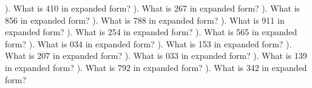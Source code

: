 \documentclass{article}%
\begin{document}
). What is 410 in expanded form?%
\newline%
\newline%
). What is 267 in expanded form?%
\newline%
\newline%
). What is 856 in expanded form?%
\newline%
\newline%
). What is 788 in expanded form?%
\newline%
\newline%
). What is 911 in expanded form?%
\newline%
\newline%
). What is 254 in expanded form?%
\newline%
\newline%
). What is 565 in expanded form?%
\newline%
\newline%
). What is 034 in expanded form?%
\newline%
\newline%
). What is 153 in expanded form?%
\newline%
\newline%
). What is 207 in expanded form?%
\newline%
\newline%
). What is 033 in expanded form?%
\newline%
\newline%
). What is 139 in expanded form?%
\newline%
\newline%
). What is 792 in expanded form?%
\newline%
\newline%
). What is 342 in expanded form?%
\newline%
\newline%
\newline%
\end{document}
